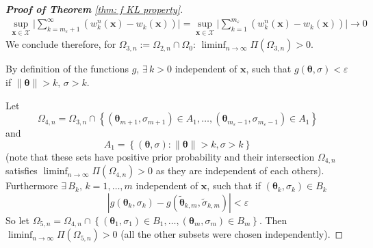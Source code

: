 \begin{proof}[\hypertarget{proof of thm KL property}{\textbf{Proof of Theorem}} \ref{thm: f KL property}]
\begin{align}\label{eq: sup convergence}
\sup_{\boldsymbol{x} \in \mathcal{X}}\bigg| \sum_{k=m_{\varepsilon}+1}^{\infty} \left( w_k^n(\boldsymbol{x}) - w_k(\boldsymbol{x}) \right) \bigg| =  \sup_{\boldsymbol{x} \in \mathcal{X}}\bigg| \sum_{k=1}^{m_{\varepsilon}} \left( w_k^n(\boldsymbol{x}) - w_k(\boldsymbol{x}) \right) \bigg| \rightarrow 0
\end{align}
We conclude therefore, for $\Omega_{3,n} := \Omega_{2,n} \cap \Omega_0$: $\liminf_{n \rightarrow \infty} \Pi (\Omega_{3,n}) >0$. 

By definition of the functions $g$, $\exists \, k>0$ independent of $\boldsymbol{x}$, such that $g(\boldsymbol{\theta}, \sigma)<\varepsilon$ if $\|\boldsymbol{\theta}\|> k, \, \sigma>k$.

Let $$\Omega_{4,n}=\Omega_{3,n} \cap \left\{\left(\boldsymbol{\theta}_{m+1}, \sigma_{m+1}\right) \in A_1, \ldots,\left(\boldsymbol{\theta}_{m_{\varepsilon}-1}, \sigma_{m_{\varepsilon}-1}\right) \in A_1\right\}$$ and $$A_1=\left\{(\boldsymbol{\theta}, \sigma):\|\boldsymbol{\theta}\|>k, \sigma> k \right\}$$  (note that these sets have positive prior probability and their intersection $\Omega_{4,n}$ satisfies $\liminf_{n \rightarrow \infty} \Pi(\Omega_{4,n}) >0 $ as they are independent of each others).
Furthermore $\exists \, B_k, \, k = 1, \ldots, m$ independent of $\boldsymbol{x}$, such that if $\left(\boldsymbol{\theta}_k, \sigma_k\right) \in B_k$
$$
|g(\boldsymbol{\theta}_{k}, \sigma_k)-g(\tilde{\boldsymbol{\theta}}_{k, m}, \tilde{\sigma}_{k, m})| <\varepsilon
$$
So let $\Omega_{5,n}=\Omega_{4,n} \cap \left\{\left(\boldsymbol{\theta}_1, \sigma_1\right) \in B_1, \ldots,\left(\boldsymbol{\theta}_{m}, \sigma_{m}\right) \in B_{m} \right\}$. Then $\liminf_{n \rightarrow \infty }\Pi\left(\Omega_{5,n} \right)>0$ (all the other subsets were chosen independently).




\end{proof}
